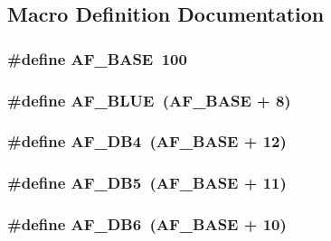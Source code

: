 \subsection{Macro Definition Documentation}
\hypertarget{lcd-adafruit_8c_a710181a64fa5dc36dc1ae8186ec077d0}{
\subsubsection[{A\-F\-\_\-\-B\-A\-S\-E}]{\setlength{\rightskip}{0pt plus 5cm}\#define A\-F\-\_\-\-B\-A\-S\-E~100}}\label{lcd-adafruit_8c_a710181a64fa5dc36dc1ae8186ec077d0}
\hypertarget{lcd-adafruit_8c_adb7d66e4f10afe077d8eac4be1cb6321}{
\subsubsection[{A\-F\-\_\-\-B\-L\-U\-E}]{\setlength{\rightskip}{0pt plus 5cm}\#define A\-F\-\_\-\-B\-L\-U\-E~({\bf A\-F\-\_\-\-B\-A\-S\-E} + 8)}}\label{lcd-adafruit_8c_adb7d66e4f10afe077d8eac4be1cb6321}
\hypertarget{lcd-adafruit_8c_a23452fcd9e29d8032f9acaeaf27389c4}{
\subsubsection[{A\-F\-\_\-\-D\-B4}]{\setlength{\rightskip}{0pt plus 5cm}\#define A\-F\-\_\-\-D\-B4~({\bf A\-F\-\_\-\-B\-A\-S\-E} + 12)}}\label{lcd-adafruit_8c_a23452fcd9e29d8032f9acaeaf27389c4}
\hypertarget{lcd-adafruit_8c_a6b13703f0bbcf92f64bf98e1fe583fbe}{
\subsubsection[{A\-F\-\_\-\-D\-B5}]{\setlength{\rightskip}{0pt plus 5cm}\#define A\-F\-\_\-\-D\-B5~({\bf A\-F\-\_\-\-B\-A\-S\-E} + 11)}}\label{lcd-adafruit_8c_a6b13703f0bbcf92f64bf98e1fe583fbe}
\hypertarget{lcd-adafruit_8c_ab403edb026623c84dbe6b9b173c7d858}{
\subsubsection[{A\-F\-\_\-\-D\-B6}]{\setlength{\rightskip}{0pt plus 5cm}\#define A\-F\-\_\-\-D\-B6~({\bf A\-F\-\_\-\-B\-A\-S\-E} + 10)}}\label{lcd-adafruit_8c_ab403edb026623c84dbe6b9b173c7d858}
